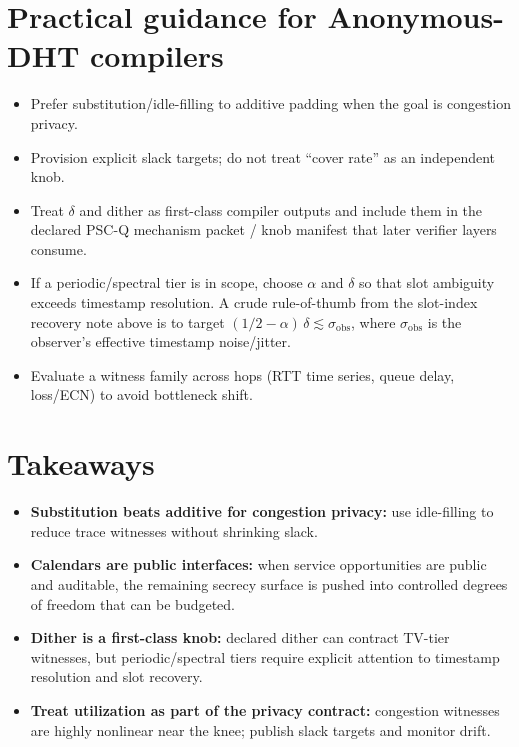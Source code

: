 \documentclass[11pt]{article}
\theoremstyle{definition}
\theoremstyle{remark}
\begin{document}
\section{Practical guidance for Anonymous-DHT compilers}
\begin{itemize}[leftmargin=1.2em]
\item Prefer substitution/idle-filling to additive padding when the goal is congestion privacy.
\item Provision explicit slack targets; do not treat ``cover rate'' as an independent knob.
\item Treat $\delta$ and dither as first-class compiler outputs and include them in the declared PSC-Q mechanism packet / knob manifest that later verifier layers consume.
\item If a periodic/spectral tier is in scope, choose \(\alpha\) and \(\delta\) so that slot ambiguity exceeds timestamp resolution.
  A crude rule-of-thumb from the slot-index recovery note above is to target \((1/2-\alpha)\,\delta \lesssim \sigma_{\mathrm{obs}}\), where \(\sigma_{\mathrm{obs}}\) is the observer's effective timestamp noise/jitter.
\item Evaluate a witness family across hops (RTT time series, queue delay, loss/ECN) to avoid bottleneck shift.
\end{itemize}

\section{Takeaways}
\begin{itemize}[leftmargin=*]
\item \textbf{Substitution beats additive for congestion privacy:} use idle-filling to reduce trace witnesses without shrinking slack.
\item \textbf{Calendars are public interfaces:} when service opportunities are public and auditable, the remaining secrecy surface is pushed into controlled degrees of freedom that can be budgeted.
\item \textbf{Dither is a first-class knob:} declared dither can contract TV-tier witnesses, but periodic/spectral tiers require explicit attention to timestamp resolution and slot recovery.
\item \textbf{Treat utilization as part of the privacy contract:} congestion witnesses are highly nonlinear near the knee; publish slack targets and monitor drift.
\end{itemize}
\end{document}
